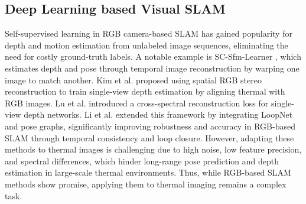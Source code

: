 \subsection{Deep Learning based Visual SLAM}
Self-supervised learning in RGB camera-based SLAM has gained popularity for depth and motion estimation from unlabeled image sequences, eliminating the need for costly ground-truth labels. A notable example is SC-Sfm-Learner \cite{zhou2017unsupervised}, which estimates depth and pose through temporal image reconstruction by warping one image to match another. Kim et al. \cite{kim2018multispectral} proposed using spatial RGB stereo reconstruction to train single-view depth estimation by aligning thermal with RGB images. Lu et al. \cite{lu2021alternative} introduced a cross-spectral reconstruction loss for single-view depth networks. Li et al. \cite{9047170} extended this framework by integrating LoopNet and pose graphs, significantly improving robustness and accuracy in RGB-based SLAM through temporal consistency and loop closure. However, adapting these methods to thermal images is challenging due to high noise, low feature precision, and spectral differences, which hinder long-range pose prediction and depth estimation in large-scale thermal environments. Thus, while RGB-based SLAM methods show promise, applying them to thermal imaging remains a complex task.